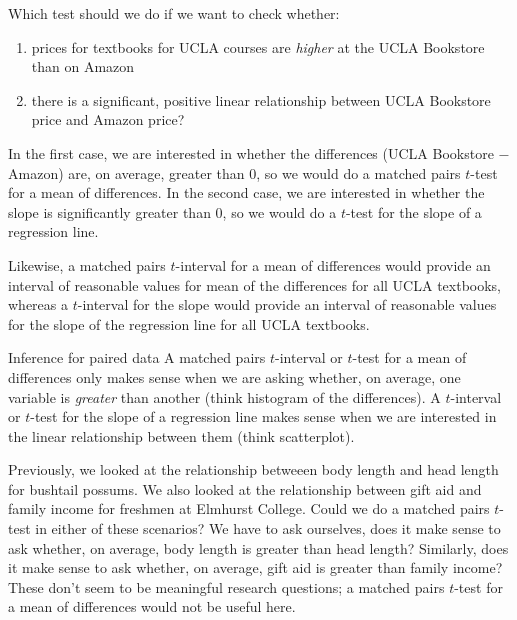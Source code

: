 \begin{examplewrap}
\begin{nexample}
{Which test should we do if we want to check whether:
\begin{enumerate}
\item prices for textbooks for UCLA courses are \emph{higher} at the UCLA Bookstore than on Amazon
\item there is a significant, positive linear relationship between UCLA Bookstore price and Amazon price?
\end{enumerate}}
In the first case, we are interested in whether the differences (UCLA Bookstore $-$ Amazon) are, on average, greater than 0, so we would do a matched pairs $t$-test for a mean of differences.  In the second case, we are interested in whether the slope is significantly greater than 0, so we would do a $t$-test for the slope of a regression line.  
\end{nexample}
\end{examplewrap}

Likewise, a matched pairs $t$-interval for a mean of differences would provide an interval of reasonable values for mean of the differences for all UCLA textbooks, whereas a $t$-interval for the slope would provide an interval of reasonable values for the slope of the regression line for all UCLA textbooks.     


\begin{onebox}{Inference for paired data}
A matched pairs $t$-interval or $t$-test for a mean of differences only makes sense when we are asking whether, on average, one variable is \emph{greater} than another (think histogram of the differences).  A $t$-interval or $t$-test for the slope of a regression line makes sense when we are interested in the linear relationship between them (think scatterplot).  
\end{onebox}


\begin{examplewrap}
\begin{nexample}
{Previously, we looked at the relationship betweeen body length and head length for bushtail possums.  We also looked at the relationship between gift aid and family income for freshmen at Elmhurst College.  Could we do a matched pairs $t$-test in either of these scenarios?}
We have to ask ourselves, does it make sense to ask whether, on average, body length is greater than head length?  Similarly, does it make sense to ask whether, on average, gift aid is greater than family income?  These don't seem to be meaningful research questions; a matched pairs $t$-test for a mean of differences would not be useful here. 
\end{nexample}
\end{examplewrap}

